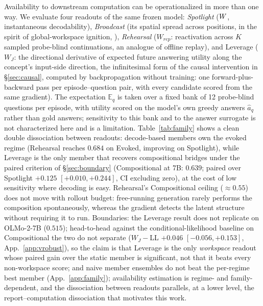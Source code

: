 Availability to downstream computation can be operationalized in more than one
way. We evaluate four readouts of the same frozen model: \emph{Spotlight}
($W$, instantaneous decodability), \emph{Broadcast} (its spatial spread across
positions, in the spirit of global-workspace ignition, \citealp{dehaene2011}),
\emph{Rehearsal} ($W_{rep}$: reactivation across $K$ sampled probe-blind
continuations, an analogue of offline replay), and Leverage ($W_J$: the
directional
derivative of expected future answering utility along the concept's input-side
direction, the infinitesimal form of the causal intervention in
\S\ref{sec:causal}, computed by backpropagation without training: one
forward-plus-backward pass per episode--question pair, with every candidate
scored from the same gradient). The expectation $\mathbb{E}_q$ is taken over a
fixed bank of 12 probe-blind questions per episode, with utility scored on the
model's own greedy answers $\hat a_q$ rather than gold answers; sensitivity to
this bank and to the answer surrogate is not characterized here and is a
limitation.
Table~\ref{tab:family} shows a clean double dissociation between readouts:
decode-based members own the evoked regime (Rehearsal reaches $0.684$ on Evoked,
improving on Spotlight), while Leverage is the only member that recovers
compositional bridges under the paired criterion of \S\ref{sec:boundary}
(Compositional at 7B: $0.639$; paired over Spotlight $+0.125$
$[+0.010, +0.244]$, CI excluding zero), at the cost of low sensitivity where decoding is easy. Rehearsal's Compositional
ceiling ($\approx 0.55$) does not move with rollout budget: free-running
generation rarely performs the composition spontaneously, whereas the gradient
detects the latent structure without requiring it to run. Boundaries: the Leverage result does not
replicate on OLMo-2-7B ($0.515$); head-to-head against the
conditional-likelihood baseline on Compositional the two do not separate
($W_J{-}$LL $+0.046$ $[-0.056, +0.153]$, App.~\ref{app:vrobust}), so the
claim is that Leverage is the only \emph{workspace} readout whose paired
gain over the static member is significant, not that it beats every
non-workspace score; and naive member ensembles do not beat the
per-regime best member (App.~\ref{app:family}); availability estimation is regime- and family-dependent, and the dissociation
between readouts parallels, at a lower level, the report--computation
dissociation that motivates this work.
